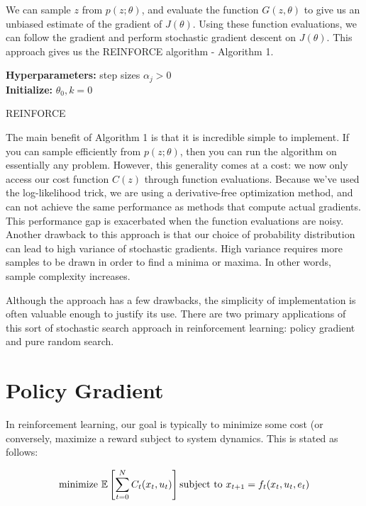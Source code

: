 \documentclass{article}[12pt]
\def\E{\mathbb{E}}
\def \E{\mathbb E}
\begin{document}
We can sample $z$ from $p(z;\theta)$, and evaluate the function $G(z,\theta)$ to give us an unbiased estimate of the gradient of $J(\theta)$. Using these function evaluations, we can follow the gradient and perform stochastic gradient descent on $J(\theta)$. This approach gives us the REINFORCE algorithm \cite{Willia1992} - Algorithm 1.

\begin{algorithm}[H]
\SetAlgoLined
\textbf{Hyperparameters:} step sizes $\alpha_j > 0 $\\
\textbf{Initialize:} $\theta_0,k = 0$\;
 \caption{REINFORCE}
\end{algorithm}

The main benefit of Algorithm 1 is that it is incredible simple to implement. If you can sample efficiently from $p(z;\theta)$, then you can run the algorithm on essentially any problem. However, this generality comes at a cost: we now only access our cost function $C(z)$ through function evaluations. Because we've used the log-likelihood trick, we are using a derivative-free optimization method, and can not achieve the same performance as methods that compute actual gradients. This performance gap is exacerbated when the function evaluations are noisy. Another drawback to this approach is that our choice of probability distribution can lead to high variance of stochastic gradients. High variance requires more samples to be drawn in order to find a minima or maxima. In other words, sample complexity increases.

Although the approach has a few drawbacks, the simplicity of implementation is often valuable enough to justify its use. There are two primary applications of this sort of stochastic search approach in reinforcement learning: policy gradient and pure random search.

\section{Policy Gradient}
In reinforcement learning, our goal is typically to minimize some cost (or conversely, maximize a reward subject to system dynamics. This is stated as follows:

\begin{equation}
\text{minimize }  \E \left[ \sum_{t=0}^N C_t(x_t,u_t)\right]\\
\text{subject to } x_{t+1} = f_t(x_t,u_t,e_t)
\end{equation}
\end{document}
